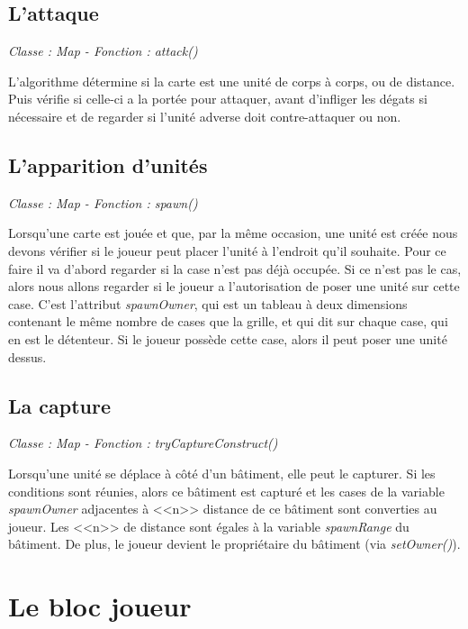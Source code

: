 \documentclass[a4paper,11pt]{report}
\begin{document}
        \subsection{L'attaque}
        \begin{center}
        \textit{Classe : Map - Fonction : attack()}
        \end{center}
        L'algorithme détermine si la carte est une unité de corps à corps, ou de distance. Puis vérifie si celle-ci a la portée pour attaquer, avant d'infliger les dégats si nécessaire et de regarder si l'unité adverse doit contre-attaquer ou non.
          
        \subsection{L'apparition d'unités}
          \begin{center}
          \textit{Classe : Map - Fonction : spawn()}
          \end{center}
            Lorsqu'une carte est jouée et que, par la même occasion, une unité est créée nous devons vérifier si le joueur peut placer l'unité à l'endroit qu'il souhaite. Pour ce faire il va d'abord regarder si la case n'est pas déjà occupée. Si ce n'est pas le cas, alors nous allons regarder si le joueur a l'autorisation de poser une unité sur cette case. C'est l'attribut \textit{spawnOwner}, qui est un tableau à deux dimensions contenant le même nombre de cases que la grille, et qui dit sur chaque case, qui en est le détenteur. Si le joueur possède cette case, alors il peut poser une unité dessus.

        
        \subsection{La capture}
          \begin{center}
           \textit{Classe : Map - Fonction : tryCaptureConstruct()}
          \end{center}
          Lorsqu'une unité se déplace à côté d'un bâtiment, elle peut le capturer. Si les conditions sont réunies, alors ce bâtiment est capturé et les cases de la variable \textit{spawnOwner} adjacentes à <<n>> distance de ce bâtiment sont converties au joueur. Les <<n>> de distance sont égales à la variable \textit{spawnRange} du bâtiment. De plus, le joueur devient le propriétaire du bâtiment (via \textit{setOwner()}).
      
      \section{Le bloc joueur}
\end{document}
